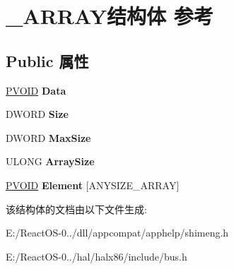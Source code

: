 \hypertarget{struct___a_r_r_a_y}{}\section{\+\_\+\+A\+R\+R\+A\+Y结构体 参考}
\label{struct___a_r_r_a_y}
\subsection*{Public 属性}
\begin{DoxyCompactItemize}
\item 
\mbox{\label{struct___a_r_r_a_y_a60380610584ee85284694eb78f350c4e}} 
\hyperlink{interfacevoid}{P\+V\+O\+ID} {\bfseries Data}
\item 
\mbox{\label{struct___a_r_r_a_y_a08385af72dad737ad1fb064ccf0f870e}} 
D\+W\+O\+RD {\bfseries Size}
\item 
\mbox{\label{struct___a_r_r_a_y_aa9f8e0009e49e09f677f7c91319a30a2}} 
D\+W\+O\+RD {\bfseries Max\+Size}
\item 
\mbox{\label{struct___a_r_r_a_y_acbb114450b59696bf50fcbb82c27f70e}} 
U\+L\+O\+NG {\bfseries Array\+Size}
\item 
\mbox{\label{struct___a_r_r_a_y_a298671c8d8263fda829c9aef23b1adce}} 
\hyperlink{interfacevoid}{P\+V\+O\+ID} {\bfseries Element} \mbox{[}A\+N\+Y\+S\+I\+Z\+E\+\_\+\+A\+R\+R\+AY\mbox{]}
\end{DoxyCompactItemize}


该结构体的文档由以下文件生成\+:\begin{DoxyCompactItemize}
\item 
E\+:/\+React\+O\+S-\/0../dll/appcompat/apphelp/shimeng.\+h\item 
E\+:/\+React\+O\+S-\/0../hal/halx86/include/bus.\+h\end{DoxyCompactItemize}
